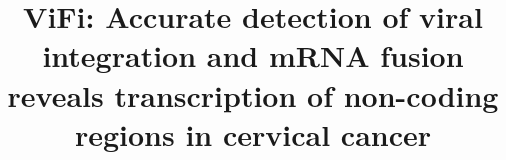 \documentclass{bmcart}
\begin{document}
\begin{frontmatter}

\begin{fmbox}


\title{ViFi: Accurate detection of viral integration and mRNA fusion reveals transcription of non-coding regions in cervical cancer}


\author[
  addressref={cse},                    %
  email={ndn006@eng.ucsd.edu}          %
]{ }
\author[
  addressref={cse},
  email={vdeshpan@cs.ucsd.edu}
]{ }
\author[
  addressref={bio},
  email={jensluebeck@gmail.com}
]{ }
\author[
  addressref={lud,path,moore},
  noteref={n1},                       %
  email={pmischel@ucsd.edu}
]{ }
\author[
  addressref={cse},
  corref={cse},                       %
  email={vbafna@eng.ucsd.edu}
]{ }




\end{fmbox}
\end{frontmatter}
\end{document}
